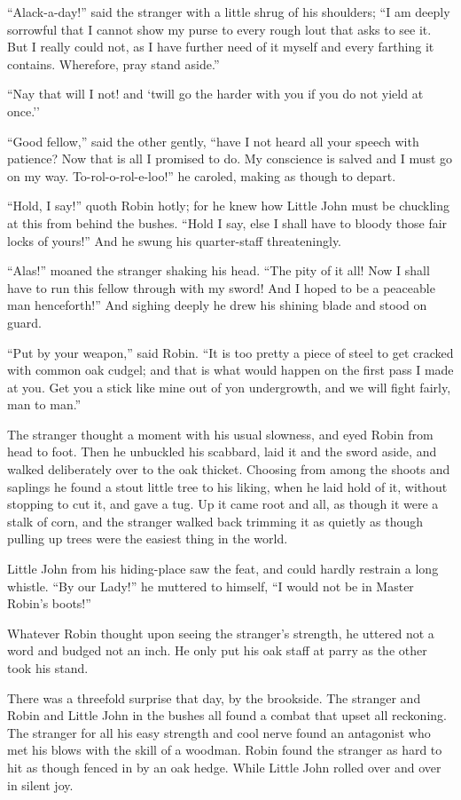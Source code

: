 ``Alack-a-day!'' said the stranger with a little shrug of his shoulders;
``I am deeply sorrowful that I cannot show my purse to every rough lout
that asks to see it. But I really could not, as I have further need of
it myself and every farthing it contains. Wherefore, pray stand aside.''

``Nay that will I not! and `twill go the harder with you if you do not
yield at once.''

``Good fellow,'' said the other gently, ``have I not heard all your
speech with patience? Now that is all I promised to do. My conscience is
salved and I must go on my way. To-rol-o-rol-e-loo!'' he caroled, making
as though to depart.

``Hold, I say!'' quoth Robin hotly; for he knew how Little John must be
chuckling at this from behind the bushes. ``Hold I say, else I shall
have to bloody those fair locks of yours!'' And he swung his
quarter-staff threateningly.

``Alas!'' moaned the stranger shaking his head. ``The pity of it all!
Now I shall have to run this fellow through with my sword! And I hoped
to be a peaceable man henceforth!'' And sighing deeply he drew his
shining blade and stood on guard.

``Put by your weapon,'' said Robin. ``It is too pretty a piece of steel
to get cracked with common oak cudgel; and that is what would happen on
the first pass I made at you. Get you a stick like mine out of yon
undergrowth, and we will fight fairly, man to man.''

The stranger thought a moment with his usual slowness, and eyed Robin
from head to foot. Then he unbuckled his scabbard, laid it and the sword
aside, and walked deliberately over to the oak thicket. Choosing from
among the shoots and saplings he found a stout little tree to his
liking, when he laid hold of it, without stopping to cut it, and gave a
tug. Up it came root and all, as though it were a stalk of corn, and the
stranger walked back trimming it as quietly as though pulling up trees
were the easiest thing in the world.

Little John from his hiding-place saw the feat, and could hardly
restrain a long whistle. ``By our Lady!'' he muttered to himself, ``I
would not be in Master Robin's boots!''

Whatever Robin thought upon seeing the stranger's strength, he uttered
not a word and budged not an inch. He only put his oak staff at parry as
the other took his stand.

There was a threefold surprise that day, by the brookside. The stranger
and Robin and Little John in the bushes all found a combat that upset
all reckoning. The stranger for all his easy strength and cool nerve
found an antagonist who met his blows with the skill of a woodman. Robin
found the stranger as hard to hit as though fenced in by an oak hedge.
While Little John rolled over and over in silent joy.

